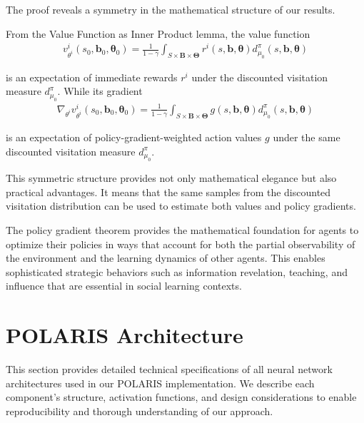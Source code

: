The proof reveals a symmetry in the mathematical structure of our results.
\begin{remark}[Symmetry]
    From the Value Function as Inner Product lemma, the value function
    \begin{align}
        v^{i}_{\theta^i}(s_{0}, \boldsymbol{b}_{0}, \boldsymbol{\theta}_{0}) = \frac{1}{1-\gamma}\int_{S \times \boldsymbol{B} \times \boldsymbol{\Theta}}r^{i}(s, \boldsymbol{b}, \boldsymbol{\theta}) d^{\pi}_{\mu_0}(s, \boldsymbol{b}, \boldsymbol{\theta})
    \end{align}

    is an expectation of immediate rewards $r^{i}$ under the discounted visitation
    measure $d^{\pi}_{\mu_0}$. While its gradient
    \begin{align}
        \nabla_{\theta^i}v^{i}_{\theta^i}(s_{0}, \boldsymbol{b}_{0}, \boldsymbol{\theta}_{0}) = \frac{1}{1-\gamma}\int_{S \times \boldsymbol{B} \times \boldsymbol{\Theta}}g(s, \boldsymbol{b}, \boldsymbol{\theta}) d^{\pi}_{\mu_0}(s, \boldsymbol{b}, \boldsymbol{\theta})
    \end{align}

    is an expectation of policy-gradient-weighted action values $g$ under the same
    discounted visitation measure $d^{\pi}_{\mu_0}$.
\end{remark}
This symmetric structure provides not only mathematical elegance but also
practical advantages. It means that the same samples from the discounted visitation
distribution can be used to estimate both values and policy gradients.

The policy gradient theorem provides the mathematical foundation for agents to optimize
their policies in ways that account for both the partial observability of the environment
and the learning dynamics of other agents. This enables sophisticated strategic
behaviors such as information revelation, teaching, and influence that are
essential in social learning contexts.

\chapter{POLARIS Architecture}
\label{appendix:neural_architectures}

This section provides detailed technical specifications of all neural network architectures used in our POLARIS implementation. We describe each component's structure, activation functions, and design considerations to enable reproducibility and thorough understanding of our approach.


